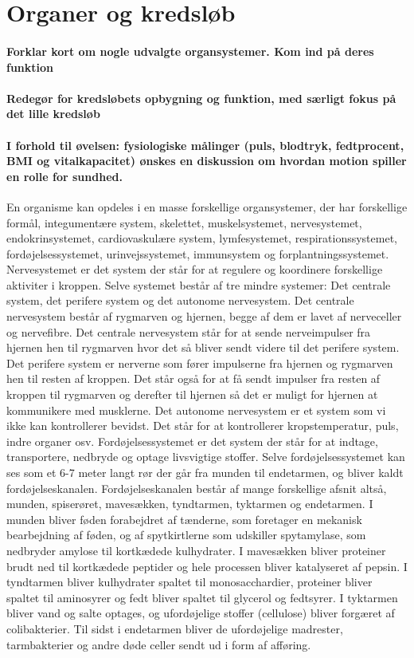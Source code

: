 \newpage
\part{Organer og kredsløb}
\subsection*{Forklar kort om nogle udvalgte organsystemer. Kom ind på deres funktion}
\subsection*{Redegør for kredsløbets opbygning og funktion, med særligt fokus på det lille kredsløb}
\subsection*{I forhold til øvelsen: fysiologiske målinger (puls, blodtryk, fedtprocent, BMI og vitalkapacitet) ønskes en diskussion om hvordan motion spiller en rolle for sundhed.}
En organisme kan opdeles i en masse forskellige organsystemer, der har forskellige formål, integumentære system, skelettet, muskelsystemet, nervesystemet, endokrinsystemet, cardiovaskulære system, lymfesystemet, respirationssystemet, fordøjelsessystemet, urinvejssystemet, immunsystem og forplantningssystemet. 
Nervesystemet er det system der står for at regulere og koordinere forskellige aktiviter i kroppen. Selve systemet består af tre mindre systemer: Det centrale system, det perifere system og det autonome nervesystem. Det centrale nervesystem består af rygmarven og hjernen, begge af dem er lavet af nerveceller og nervefibre. Det centrale nervesystem står for at sende nerveimpulser fra hjernen hen til rygmarven hvor det så bliver sendt videre til det perifere system. Det perifere system er nerverne som fører impulserne fra hjernen og rygmarven hen til resten af kroppen. Det står også for at få sendt impulser fra resten af kroppen til rygmarven og derefter til hjernen så det er muligt for hjernen at kommunikere med musklerne. Det autonome nervesystem er et system som vi ikke kan kontrollerer bevidst. Det står for at kontrollerer kropstemperatur, puls, indre organer osv. 
Fordøjelsessystemet er det system der står for at indtage, transportere, nedbryde og optage livsvigtige stoffer. Selve fordøjelsessystemet kan ses som et 6-7 meter langt rør der går fra munden til endetarmen, og bliver kaldt fordøjelseskanalen. Fordøjelseskanalen består af mange forskellige afsnit altså, munden, spiserøret, mavesækken, tyndtarmen, tyktarmen og endetarmen. I munden bliver føden forabejdret af tænderne, som foretager en mekanisk bearbejdning af føden, og af spytkirtlerne som udskiller spytamylase, som nedbryder amylose til kortkædede kulhydrater. I mavesækken bliver proteiner brudt ned til kortkædede peptider og hele processen bliver katalyseret af pepsin. I tyndtarmen bliver kulhydrater spaltet til monosacchardier, proteiner bliver spaltet til aminosyrer og fedt bliver spaltet til glycerol og fedtsyrer. I tyktarmen bliver vand og salte optages, og ufordøjelige stoffer (cellulose) bliver forgæret af colibakterier. Til sidst i endetarmen bliver de ufordøjelige madrester, tarmbakterier og andre døde celler sendt ud i form af afføring.
